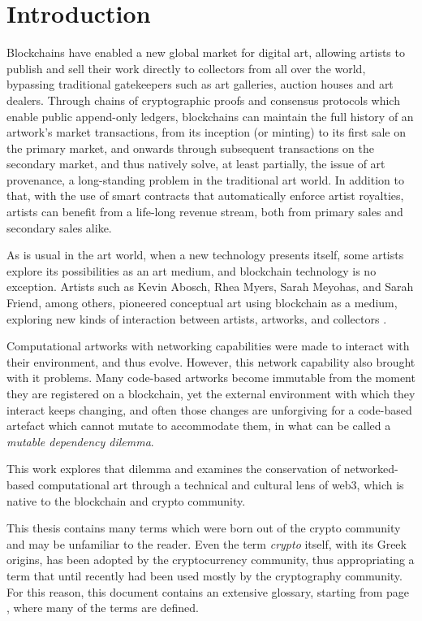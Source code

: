 \chapter{Introduction}
\label{chap:introduction}

Blockchains have enabled a new global market for digital art, allowing artists to publish and sell their work directly to collectors from all over the world, bypassing traditional gatekeepers such as art galleries, auction houses and art dealers. Through chains of cryptographic proofs and consensus protocols which enable public append-only ledgers, blockchains can maintain the full history of an artwork's market transactions, from its inception (or \gls{minting}) to its first sale on the \gls{primary market}, and onwards through subsequent transactions on the \gls{secondary market}, and thus natively solve, at least partially, the issue of art provenance, a long-standing problem in the traditional art world. In addition to that, with the use of smart contracts that automatically enforce artist royalties, artists can benefit from a life-long revenue stream, both from \gls{primary sales} and \gls{secondary sales} alike.

As is usual in the art world, when a new technology presents itself, some artists explore its possibilities as an art medium, and blockchain technology is no exception. Artists such as Kevin Abosch, Rhea Myers, Sarah Meyohas, and Sarah Friend, among others, pioneered \gls{conceptual art} using blockchain as a medium, exploring new kinds of interaction between artists, artworks, and collectors \cite{rcsBlockchainMedium2022}.

Computational artworks with networking capabilities were made to interact with their environment, and thus evolve. However, this network capability also brought with it problems. Many code-based artworks become immutable from the moment they are registered on a blockchain, yet the external environment with which they interact keeps changing, and often those changes are unforgiving for a code-based artefact which cannot mutate to accommodate them, in what can be called a \emph{mutable dependency dilemma}.

This work explores that dilemma and examines the conservation of networked-based computational art through a technical and cultural lens of \gls{web3}, which is native to the blockchain and crypto community.

This thesis contains many terms which were born out of the crypto community and may be unfamiliar to the reader. Even the term \emph{crypto} itself, with its Greek origins, has been adopted by the cryptocurrency community, thus appropriating a term that until recently had been used mostly by the cryptography community. For this reason, this document contains an extensive glossary, starting from page \pageref{sec:glossary}, where many of the terms are defined.

